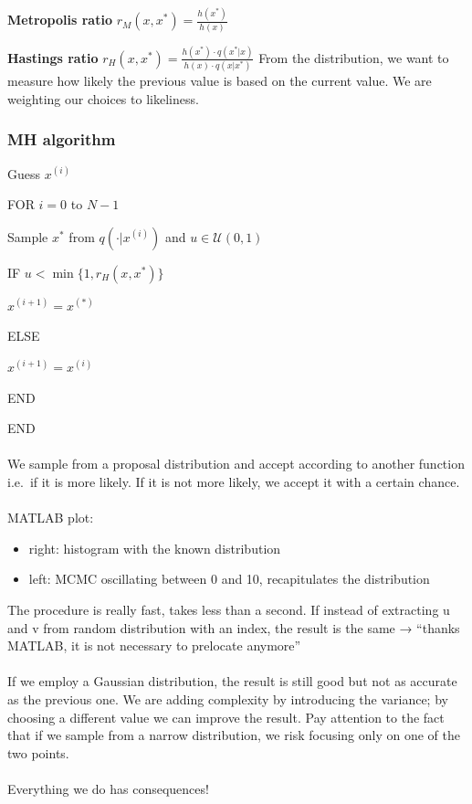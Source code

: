 \textbf{Metropolis ratio} $r_M(x,x^*)=\frac{h(x^*)}{h(x)}$

\textbf{Hastings ratio}
$r_H(x,x^*)=\frac{h(x^*)\cdot q(x^*|x)}{h(x)\cdot q(x|x^*)}$
\noindent
From the distribution, we want to measure how likely the previous value
is based on the current value. We are weighting our choices to
likeliness.


\subsubsection{MH algorithm}

Guess $x^{(i)}$

FOR $i=0$ to $N-1$

Sample $x^*$ from $q(\cdot|x^{(i)})$ and $u \in \mathcal{U}(0,1)$

IF $u < \min \{1, r_H(x,x^*) \}$

$x^{(i+1)}=x^{(*)}$

ELSE

$x^{(i+1)}=x^{(i)}$

END

END
\\
\\
\noindent
We sample from a proposal distribution and accept according to another
function i.e.~if it is more likely. If it is not more likely, we accept
it with a certain chance.
\\
\\
\noindent
MATLAB plot:

\begin{itemize}
\tightlist
\item
  right: histogram with the known distribution
\item
  left: MCMC oscillating between 0 and 10, recapitulates the
  distribution
\end{itemize}
\noindent
The procedure is really fast, takes less than a second. If instead of
extracting u and v from random distribution with an index, the result is
the same → ``thanks MATLAB, it is not necessary to prelocate anymore''
\\
\\
\noindent
If we employ a Gaussian distribution, the result is still good but not
as accurate as the previous one. We are adding complexity by introducing
the variance; by choosing a different value we can improve the result.
Pay attention to the fact that if we sample from a narrow distribution,
we risk focusing only on one of the two points.
\\
\\
\noindent
Everything we do has consequences!


